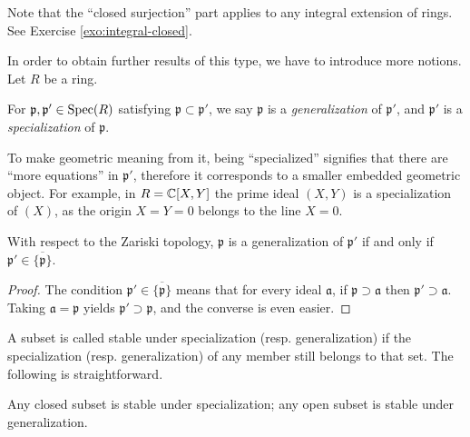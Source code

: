 Note that the ``closed surjection'' part applies to any integral extension of rings. See Exercise \ref{exo:integral-closed}.

In order to obtain further results of this type, we have to introduce more notions. Let $R$ be a ring.
\begin{definition}
	For $\mathfrak{p}, \mathfrak{p}' \in \operatorname{Spec}(R)$ satisfying $\mathfrak{p} \subset \mathfrak{p}'$, we say $\mathfrak{p}$ is a \emph{generalization} of $\mathfrak{p}'$, and $\mathfrak{p}'$ is a \emph{specialization} of $\mathfrak{p}$.
\end{definition}
To make geometric meaning from it, being ``specialized'' signifies that there are ``more equations'' in $\mathfrak{p}'$, therefore it corresponds to a smaller embedded geometric object. For example, in $R=\mathbb{C}[X,Y]$ the prime ideal $(X,Y)$ is a specialization of $(X)$, as the origin $X=Y=0$ belongs to the line $X=0$.

\begin{lemma}
	With respect to the Zariski topology, $\mathfrak{p}$ is a generalization of $\mathfrak{p}'$ if and only if $\mathfrak{p}' \in \overline{\{\mathfrak{p}\}}$.
\end{lemma}
\begin{proof}
	The condition $\mathfrak{p}' \in \overline{\{\mathfrak{p}\}}$ means that for every ideal $\mathfrak{a}$, if $\mathfrak{p} \supset \mathfrak{a}$ then $\mathfrak{p}' \supset \mathfrak{a}$. Taking $\mathfrak{a} = \mathfrak{p}$ yields $\mathfrak{p}' \supset \mathfrak{p}$, and the converse is even easier.
\end{proof}
A subset is called stable under specialization (resp. generalization) if the specialization (resp. generalization) of any member still belongs to that set. The following is straightforward.

\begin{lemma}\label{prop:stability-vs-closeness-0}
	Any closed subset is stable under specialization; any open subset is stable under generalization.
\end{lemma}

